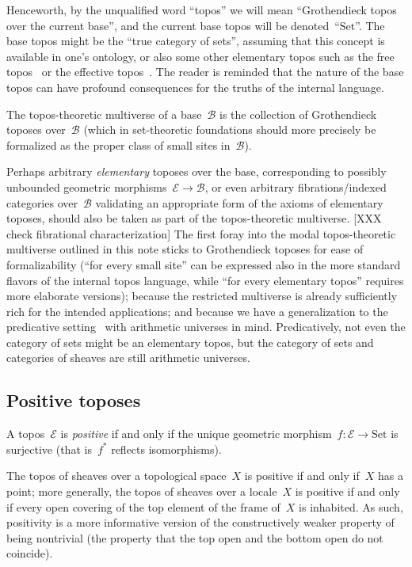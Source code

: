 \documentclass[envcountsect,envcountsame,runningheads]{llncs}
\newcommand{\E}{\mathcal{E}}
\newcommand{\B}{\mathcal{B}}
\newcommand{\Set}{\mathrm{Set}}
\renewcommand{\_}{\mathpunct{.}\,}
\newcommand{\?}{\,{:}\,}
\begin{document}
Henceworth, by the unqualified word ``topos'' we will mean ``Grothendieck topos
over the current base'', and the current base topos will be denoted~``$\Set$''.
The base topos might be the ``true category of sets'', assuming that this
concept is available in one's ontology, or also some other elementary topos
such as the free topos~\cite{lambek:1980intuitionist} or the ef{}fective topos~\cite{hyland:effective-topos}. The reader is reminded that the nature of the base topos can have profound consequences for the truths of the internal language.

The topos-theoretic multiverse of a base~$\B$ is the collection of Grothendieck
toposes over~$\B$ (which in set-theoretic foundations should more precisely be
formalized as the proper class of small sites in~$\B$).

\begin{remark}Perhaps arbitrary \emph{elementary} toposes over the base, corresponding to
possibly unbounded geometric morphisms~$\E \to \B$, or even arbitrary
fibrations/indexed categories over~$\B$ validating an appropriate form of the
axioms of elementary toposes, should also be
taken as part of the topos-theoretic multiverse. [XXX check fibrational characterization] The first foray into the
modal topos-theoretic multiverse outlined in this note
sticks to Grothendieck toposes for ease of
formalizability (``for every small site'' can be expressed also in the more
standard flavors of the internal topos language, while ``for every elementary
topos'' requires more elaborate versions); because the restricted multiverse
is already sufficiently rich for the intended applications; and because we have
a generalization to the predicative setting~\cite{crosilla:xxx} with arithmetic
universes in mind. Predicatively, not even the category of sets might be an
elementary topos, but the category of sets and categories of sheaves are still
arithmetic universes.
\end{remark}


\subsection{Positive toposes}

\begin{definition}A topos~$\E$ is \emph{positive} if and only if the unique geometric
morphism~$f : \E \to \Set$ is surjective (that is~$f^*$ reflects
isomorphisms).\end{definition}

\begin{example}The topos of sheaves over a topological space~$X$ is positive if and
only if~$X$ has a point; more generally, the topos of sheaves over a locale~$X$
is positive if and only if every open covering of the top element of the frame
of~$X$ is inhabited. As such, positivity is a more informative
version of the constructively weaker property of being nontrivial (the property that the top open
and the bottom open do not coincide).\end{example}
\end{document}

